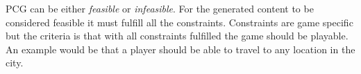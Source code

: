 PCG can be either \textit{feasible} or \textit{infeasible}. For the generated content to be considered feasible it must fulfill all the constraints\cite{NoveltySearch}. Constraints are game specific but the criteria is that with all constraints fulfilled the game should be playable. An example would be that a player should be able to travel to any location in the city.